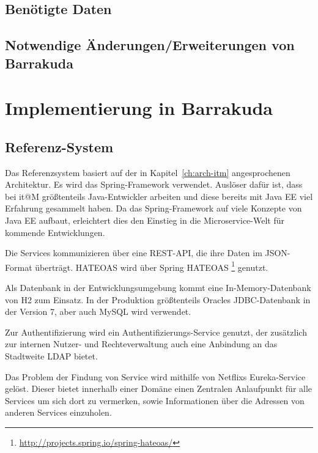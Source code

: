 \documentclass[12pt,a4paper,bibliography=totocnumbered,listof=totocnumbered]{scrartcl}
\begin{document}
\subsection{Benötigte Daten}

\subsection{Notwendige Änderungen/Erweiterungen von Barrakuda}

\section{Implementierung in Barrakuda}\label{ch:implementierung}

\subsection{Referenz-System}

Das Referenzsystem basiert auf der in Kapitel~\ref{ch:arch-itm} angesprochenen Architektur. Es wird das Spring-Framework verwendet. Auslöser dafür ist, dass bei it@M größtenteils Java-Entwickler arbeiten und diese bereits mit Java EE viel Erfahrung gesammelt haben. Da das Spring-Framework auf viele Konzepte von Java EE aufbaut, erleichtert dies den Einstieg in die Microservice-Welt für kommende Entwicklungen.

Die Services kommunizieren über eine REST-\ac{API}, die ihre Daten im JSON-Format überträgt. HATEOAS wird über Spring HATEOAS \footnote{\url{http://projects.spring.io/spring-hateoas/}} genutzt.

Als Datenbank in der Entwicklungsumgebung kommt eine In-Memory-Datenbank von H2 zum Einsatz. In der Produktion größtenteils Oracles JDBC-Datenbank in der Version 7, aber auch MySQL wird verwendet.

Zur Authentifizierung wird ein Authentifizierungs-Service genutzt, der zusätzlich zur internen Nutzer- und Rechteverwaltung auch eine Anbindung an das Stadtweite \ac{LDAP} bietet.

Das Problem der Findung von Service wird mithilfe von Netflixs Eureka-Service gelöst. Dieser bietet innerhalb einer Domäne einen Zentralen Anlaufpunkt für alle Services um sich dort zu vermerken, sowie Informationen über die Adressen von anderen Services einzuholen.
\end{document}
